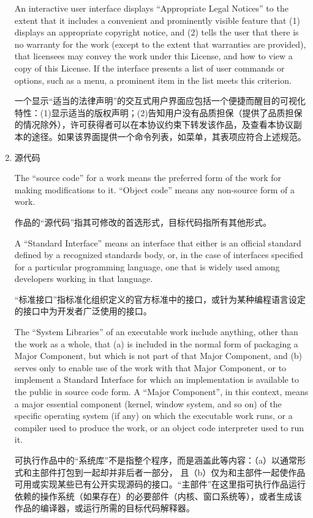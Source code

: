\documentclass[11pt]{article}
\begin{document}
\begin{enumerate}
An interactive user interface displays ``Appropriate Legal Notices''
to the extent that it includes a convenient and prominently visible
feature that (1) displays an appropriate copyright notice, and (2)
tells the user that there is no warranty for the work (except to the
extent that warranties are provided), that licensees may convey the
work under this License, and how to view a copy of this License.  If
the interface presents a list of user commands or options, such as a
menu, a prominent item in the list meets this criterion.

一个显示“适当的法律声明”的交互式用户界面应包括一个便捷而醒目的可视化特性：(1)显示适当的版权声明；(2)告知用户没有品质担保（提供了品质担保的情况除外），许可获得者可以在本协议约束下转发该作品，及查看本协议副本的途径。如果该界面提供一个命令列表，如菜单，其表项应符合上述规范。


\item 源代码

The ``source code'' for a work means the preferred form of the work
for making modifications to it.  ``Object code'' means any non-source
form of a work.

作品的“源代码”指其可修改的首选形式，目标代码指所有其他形式。

A ``Standard Interface'' means an interface that either is an official
standard defined by a recognized standards body, or, in the case of
interfaces specified for a particular programming language, one that
is widely used among developers working in that language.

“标准接口”指标准化组织定义的官方标准中的接口，或针为某种编程语言设定的接口中为开发者广泛使用的接口。

The ``System Libraries'' of an executable work include anything, other
than the work as a whole, that (a) is included in the normal form of
packaging a Major Component, but which is not part of that Major
Component, and (b) serves only to enable use of the work with that
Major Component, or to implement a Standard Interface for which an
implementation is available to the public in source code form.  A
``Major Component'', in this context, means a major essential component
(kernel, window system, and so on) of the specific operating system
(if any) on which the executable work runs, or a compiler used to
produce the work, or an object code interpreter used to run it.

可执行作品中的“系统库”不是指整个程序，而是涵盖此等内容：（a）以通常形式和主部件打包到一起却并非后者一部分，
且（b）仅为和主部件一起使作品可用或实现某些已有公开实现源码的接口。“主部件”在这里指可执行作品运行依赖的操作系统（如果存在）的必要部件（内核、窗口系统等），或者生成该作品的编译器，或运行所需的目标代码解释器。


\end{enumerate}
\end{document}
